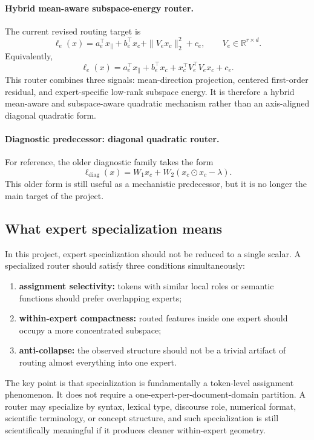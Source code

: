 \documentclass[11pt]{article}
\begin{document}
\paragraph{Hybrid mean-aware subspace-energy router.}
The current revised routing target is
\[
\ell_e(x)
=
a_e^\top x_{\parallel}
+
b_e^\top x_c
+
\|V_e x_c\|_2^2
+
c_e,
\qquad
V_e\in\mathbb{R}^{r\times d}.
\]
Equivalently,
\[
\ell_e(x)
=
a_e^\top x_{\parallel}
+
b_e^\top x_c
+
x_c^\top V_e^\top V_e x_c
+
c_e.
\]
This router combines three signals: mean-direction projection, centered first-order residual, and expert-specific low-rank subspace energy. It is therefore a hybrid mean-aware and subspace-aware quadratic mechanism rather than an axis-aligned diagonal quadratic form.

\paragraph{Diagnostic predecessor: diagonal quadratic router.}
For reference, the older diagnostic family takes the form
\[
\ell_{\mathrm{diag}}(x)=W_1 x_c + W_2(x_c\odot x_c-\lambda).
\]
This older form is still useful as a mechanistic predecessor, but it is no longer the main target of the project.

\subsection{What expert specialization means}

In this project, expert specialization should not be reduced to a single scalar. A specialized router should satisfy three conditions simultaneously:
\begin{enumerate}
    \item \textbf{assignment selectivity:} tokens with similar local roles or semantic functions should prefer overlapping experts;
    \item \textbf{within-expert compactness:} routed features inside one expert should occupy a more concentrated subspace;
    \item \textbf{anti-collapse:} the observed structure should not be a trivial artifact of routing almost everything into one expert.
\end{enumerate}

The key point is that specialization is fundamentally a token-level assignment phenomenon. It does not require a one-expert-per-document-domain partition. A router may specialize by syntax, lexical type, discourse role, numerical format, scientific terminology, or concept structure, and such specialization is still scientifically meaningful if it produces cleaner within-expert geometry.
\end{document}
